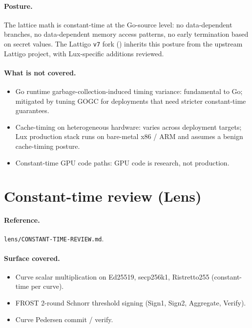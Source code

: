 \documentclass[11pt,a4paper]{article}
\begin{document}
\paragraph{Posture.} The lattice math is constant-time at the Go-source level: no data-dependent branches, no data-dependent memory access patterns, no early termination based on secret values. The Lattigo \texttt{v7} fork (\cite{lattigov7}) inherits this posture from the upstream Lattigo project, with Lux-specific additions reviewed.

\paragraph{What is not covered.}
\begin{itemize}[leftmargin=2em,nosep]
  \item Go runtime garbage-collection-induced timing variance: fundamental to Go; mitigated by tuning GOGC for deployments that need stricter constant-time guarantees.
  \item Cache-timing on heterogeneous hardware: varies across deployment targets; Lux production stack runs on bare-metal x86 / ARM and assumes a benign cache-timing posture.
  \item Constant-time GPU code paths: GPU code is research, not production.
\end{itemize}

\section{Constant-time review (Lens)}

\paragraph{Reference.} \texttt{lens/CONSTANT-TIME-REVIEW.md}.

\paragraph{Surface covered.}
\begin{itemize}[leftmargin=2em,nosep]
  \item Curve scalar multiplication on Ed25519, secp256k1, Ristretto255 (constant-time per curve).
  \item FROST 2-round Schnorr threshold signing (Sign1, Sign2, Aggregate, Verify).
  \item Curve Pedersen commit / verify.
\end{itemize}
\end{document}
